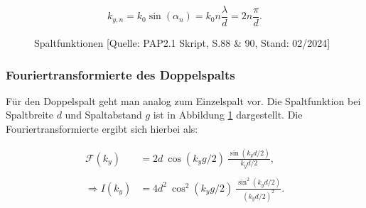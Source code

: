 \documentclass{article}
\begin{document}
\begin{equation}
    k_{y,n} = k_0 \sin{(\alpha_n)} = k_0 n \frac{\lambda}{d} = 2 n \frac{\pi}{d}.
    \label{eq:01_k_yn}
\end{equation}

\begin{figure}[h]
  \centering
  \hfill
  \hfill
  \caption{Spaltfunktionen [Quelle: PAP2.1 Skript, S.88 \& 90, Stand: 02/2024]}
  \label{fig:Spaltfunktionen}
\end{figure}

\newpage
\subsubsection{Fouriertransformierte des Doppelspalts}

Für den Doppelspalt geht man analog zum Einzelspalt vor. Die Spaltfunktion bei Spaltbreite $d$ und Spaltabstand $g$ ist in Abbildung \ref{fig:Spaltfunktionen} dargestellt. Die Fouriertransformierte ergibt sich hierbei als:

\begin{equation}
    \begin{split}
        \mathcal{F}(k_y) &= 2d \ \cos{(k_y g/2)} \ \frac{\sin{(k_y d/2)}}{k_y d/2}, \\ \\
        \Rightarrow I(k_y) &= 4d^2 \ \cos^2{(k_y g/2)} \ \frac{\sin^2{(k_y d/2)}}{(k_y d/2)^2}.
    \end{split}
\end{equation}
\end{document}
